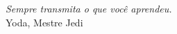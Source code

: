 \begin{epigrafe}
    \textit{Sempre transmita o que você aprendeu.} \\
    Yoda, Mestre Jedi
\end{epigrafe}
